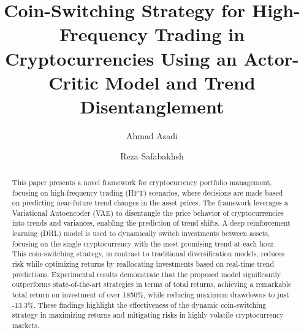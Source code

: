 \documentclass[preprint,review,12pt]{elsarticle}
\begin{document}
\begin{frontmatter}

\title{Coin-Switching Strategy for High-Frequency Trading in Cryptocurrencies Using an Actor-Critic Model and Trend Disentanglement}

\author{Ahmad Asadi}%
\author{Reza Safabakhsh}




\address{Deep Learning Lab, Computer Engineering Department}
\address{Amirkabir University of Technology, Tehran, Iran.}

\begin{abstract}
This paper presents a novel framework for cryptocurrency portfolio management, focusing on high-frequency trading (HFT) scenarios, where decisions are made based on predicting near-future trend changes in the asset prices. The framework leverages a Variational Autoencoder (VAE) to disentangle the price behavior of cryptocurrencies into trends and variances, enabling the prediction of trend shifts. A deep reinforcement learning (DRL) model is used to dynamically switch investments between assets, focusing on the single cryptocurrency with the most promising trend at each hour. This coin-switching strategy, in contrast to traditional diversification models, reduces risk while optimizing returns by reallocating investments based on real-time trend predictions. Experimental results demonstrate that the proposed model significantly outperforms state-of-the-art strategies in terms of total returns, achieving a remarkable total return on investment of over 1850\%, while reducing maximum drawdowns to just -13.3\%. These findings highlight the effectiveness of the dynamic coin-switching strategy in maximizing returns and mitigating risks in highly volatile cryptocurrency markets.
\end{abstract}



\end{frontmatter}
\end{document}
